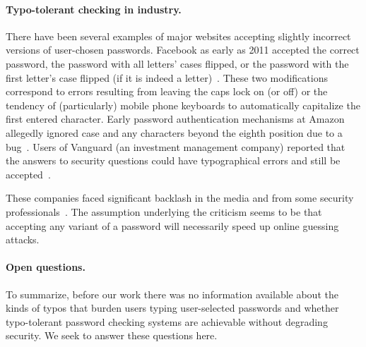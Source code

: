 

\paragraph{Typo-tolerant checking in industry.} 
There have been several examples of major websites accepting slightly
incorrect versions of user-chosen passwords.  Facebook as early as
2011 accepted the correct password, the password with all letters'
cases flipped, or the password with the first letter's case flipped (if
it is indeed a letter)~\cite{muffett15,zdnet2011Facebook}.  These two
modifications correspond to errors resulting from leaving the caps
lock on (or off) or the tendency of (particularly) mobile phone
keyboards to automatically capitalize the first entered character. Early password authentication mechanisms at Amazon
allegedly ignored case and any characters beyond the eighth
position due to a bug~\cite{ghacks2011Amazon}. 
Users of Vanguard (an investment management company) reported that the answers to
security questions could have typographical errors and still be
accepted~\cite{vanguard15i}.

These companies faced significant backlash in the media and from some security
professionals~\cite{vanguard15i,ghacks2011Amazon,zdnet2011Facebook}. The
assumption underlying the criticism seems to be that accepting any variant of a
password will necessarily speed up online guessing attacks.

\paragraph{Open questions.} To summarize, before our work there was no
information available about the kinds of typos that burden users typing user-selected passwords and
whether typo-tolerant password checking systems are achievable without
degrading security. We seek to answer these questions here.

  
  

